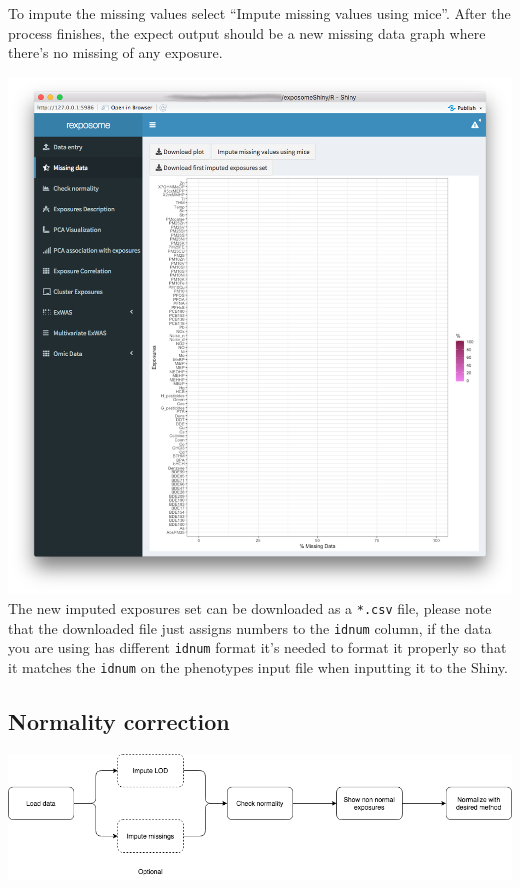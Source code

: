 \documentclass[
]{book}
\begin{document}
To impute the missing values select ``Impute missing values using mice''. After the process finishes, the expect output should be a new missing data graph where there's no missing of any exposure.

\includegraphics{images/analysis2_3.png}
The new imputed exposures set can be downloaded as a \texttt{*.csv} file, please note that the downloaded file just assigns numbers to the \texttt{idnum} column, if the data you are using has different \texttt{idnum} format it's needed to format it properly so that it matches the \texttt{idnum} on the phenotypes input file when inputting it to the Shiny.

\hypertarget{normality-correction}{%
\subsection{Normality correction}\label{normality-correction}}

\includegraphics{images/analysis3_1.png}
\end{document}
